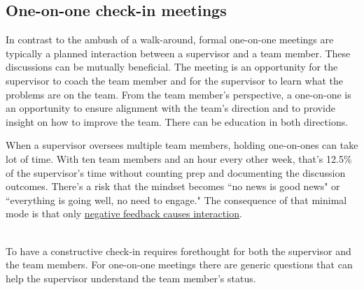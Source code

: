 \subsection*{One-on-one check-in meetings\label{sec:meetings-one-on-one}}





In contrast to the ambush of a walk-around, formal one-on-one meetings are typically a planned interaction between a supervisor and a team member. These discussions can be mutually beneficial. The meeting is an opportunity for the supervisor to coach the team member and for the supervisor to learn what the problems are on the team. From the team member's perspective, a one-on-one is an opportunity to ensure alignment with the team's direction and to provide insight on how to improve the team. There can be education in both directions. 

When a supervisor oversees multiple team members, holding one-on-ones can take lot of time. With ten team members and an hour every other week, that's 12.5\% of the supervisor's time without counting prep and documenting the discussion outcomes.  There's a risk that the mindset becomes ``no news is good news" or ``everything is going well, no need to engage." The consequence of that minimal mode is that only 
\href{https://en.wikipedia.org/wiki/Seagull_management}{negative feedback causes interaction}. 

\ \\


To have a constructive check-in requires forethought for both the supervisor and the team members. For one-on-one meetings there are generic questions that can help the supervisor understand the team member's status. 

